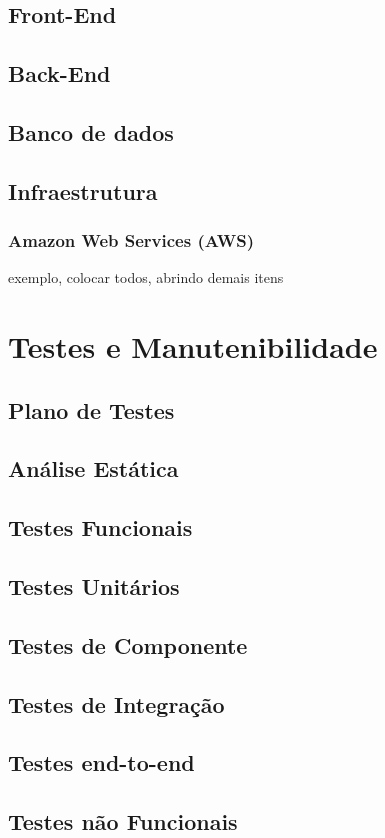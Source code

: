 \documentclass[
12pt,				%
openright,			%
twoside,			%
a4paper,			%
english,			%
french,				%
spanish,			%
brazil				%
]{abntex2}
\begin{document}
	\subsection{Front-End}
	\subsection{Back-End}
	\subsection{Banco de dados}
	\subsection{Infraestrutura}
	\subsubsection{Amazon Web Services (AWS)}
	exemplo, colocar todos, abrindo demais itens
	\section{Testes e Manutenibilidade}
	\subsection{Plano de Testes}
	\subsection{Análise Estática}
	\subsection{Testes Funcionais}
	\subsection{Testes Unitários}
	\subsection{Testes de Componente}
	\subsection{Testes de Integração}
	\subsection{Testes end-to-end}
	\subsection{Testes não Funcionais}
\end{document}
